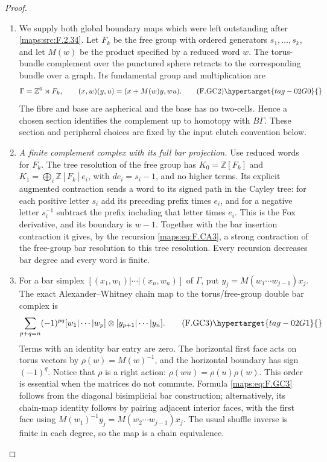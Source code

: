 \begin{proof}
\begin{enumerate}[label={$\langle1\rangle$\arabic*.}]
\item We supply both global boundary maps which were left outstanding
after \ref{maps:src:F.2.34}.  Let $F_k$ be the free group with ordered
generators $s_1,\ldots,s_k$, and let $M(w)$ be the product
specified by a reduced word $w$.  The torus-bundle complement
over the punctured sphere retracts to the corresponding bundle
over a graph.  Its fundamental group and multiplication are
\[
 \Gamma=\mathbb Z^6\rtimes F_k,
 \qquad (x,w)(y,u)=(x+M(w)y,wu).                            \tag{F.GC2}\hypertarget{tag-02G0}{}\label{maps:eq:F.GC2}
\]
The fibre and base are aspherical and the base has no
two-cells.  Hence a chosen section identifies the complement
up to homotopy with $B\Gamma$.  These section and peripheral
choices are fixed by the input clutch convention below.

\item \emph{A finite complement complex with its full bar projection.}
Use reduced words for $F_k$.  The tree resolution of the free
group has $K_0=\mathbb Z[F_k]$ and
$K_1=\bigoplus_i\mathbb Z[F_k]e_i$, with
$de_i=s_i-1$, and no higher terms.  Its explicit augmented
contraction sends a word to its signed path in the Cayley
tree: for each positive letter $s_i$ add its preceding prefix
times $e_i$, and for a negative letter $s_i^{-1}$ subtract
the prefix including that letter times $e_i$.
This is the Fox derivative, and its boundary is $w-1$.
Together with the bar insertion contraction it gives, by
the recursion \eqref{maps:eq:F.CA3}, a strong contraction of the free-group
bar resolution to this tree resolution.  Every recursion
decreases bar degree and every word is finite.

\item For a bar simplex $[(x_1,w_1)|\cdots|(x_n,w_n)]$ of $\Gamma$,
put $y_j=M(w_1\cdots w_{j-1})x_j$.
The exact Alexander--Whitney chain map to the torus/free-group
double bar complex is
\[
 \sum_{p+q=n}(-1)^{pq}
 [w_1|\cdots|w_p]\otimes[y_{p+1}|\cdots|y_n].              \tag{F.GC3}\hypertarget{tag-02G1}{}\label{maps:eq:F.GC3}
\]
Terms with an identity bar entry are zero.  The horizontal
first face acts on torus vectors by
$\rho(w)=M(w)^{-1}$, and the horizontal boundary has sign
$(-1)^q$.  Notice that $\rho$ is a right action:
$\rho(wu)=\rho(u)\rho(w)$.  This order is essential when
the matrices do not commute.  Formula \eqref{maps:eq:F.GC3} follows from
the diagonal bisimplicial bar construction; alternatively,
its chain-map identity follows by pairing adjacent interior
faces, with the first face using
$M(w_1)^{-1}y_j=M(w_2\cdots w_{j-1})x_j$.
The usual shuffle inverse is finite in each degree, so the
map is a chain equivalence.


\end{enumerate}
\end{proof}
